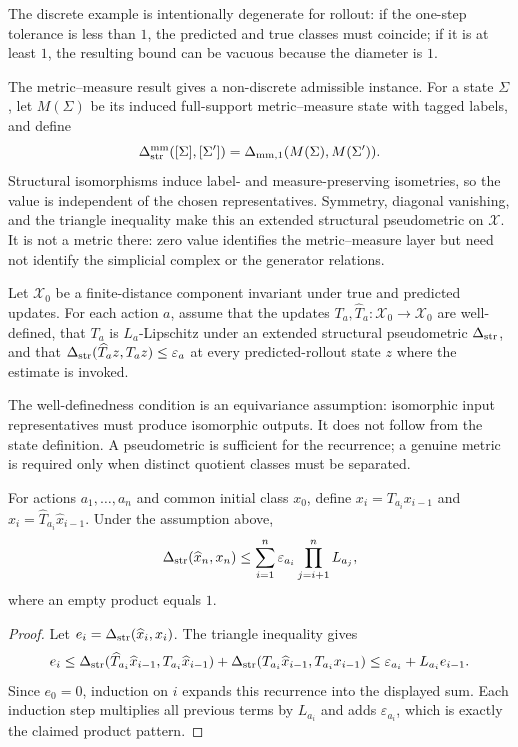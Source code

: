The discrete example is intentionally degenerate for rollout: if the one-step
tolerance is less than $1$, the predicted and true classes must coincide; if it
is at least $1$, the resulting bound can be vacuous because the diameter is
$1$.

The metric--measure result gives a non-discrete admissible instance. For a
state $\Sigma$, let $M(\Sigma)$ be its induced full-support metric--measure
state with tagged labels, and define
\[
 \Delta_{\mathrm{str}}^{\mathrm{mm}}([\Sigma],[\Sigma'])
 =\Delta_{\mathrm{mm},1}(M(\Sigma),M(\Sigma')).
\]
Structural isomorphisms induce label- and measure-preserving isometries, so the
value is independent of the chosen representatives. Symmetry, diagonal
vanishing, and the triangle inequality make this an extended structural
pseudometric on $\mathcal X$. It is not a metric there: zero value identifies
the metric--measure layer but need not identify the simplicial complex or the
generator relations.

\begin{assumption}
Let $\mathcal X_0$ be a finite-distance component invariant under true and
predicted updates. For each action $a$, assume that the updates
$T_a,\widehat T_a:\mathcal X_0\to\mathcal X_0$ are well-defined, that $T_a$ is
$L_a$-Lipschitz under an extended structural pseudometric $\Delta_{\mathrm{str}}$, and that
$\Delta_{\mathrm{str}}(\widehat T_a z,T_a z)\leq\varepsilon_a$ at every predicted-rollout
state $z$ where the estimate is invoked.
\end{assumption}

The well-definedness condition is an equivariance assumption: isomorphic input
representatives must produce isomorphic outputs. It does not follow from the
state definition. A pseudometric is sufficient for the recurrence; a genuine
metric is required only when distinct quotient classes must be separated.

\begin{theorem}
For actions $a_1,\ldots,a_n$ and common initial class $x_0$, define
$x_i=T_{a_i}x_{i-1}$ and $\widehat x_i=\widehat T_{a_i}\widehat x_{i-1}$. Under
the assumption above,
\[
\Delta_{\mathrm{str}}(\widehat x_n,x_n)\leq
\sum_{i=1}^n\varepsilon_{a_i}\prod_{j=i+1}^nL_{a_j},
\]
where an empty product equals $1$.
\end{theorem}

\begin{proof}
Let $e_i=\Delta_{\mathrm{str}}(\widehat x_i,x_i)$. The triangle inequality gives
\[
e_i\leq\Delta_{\mathrm{str}}(\widehat T_{a_i}\widehat x_{i-1},T_{a_i}\widehat x_{i-1})+
\Delta_{\mathrm{str}}(T_{a_i}\widehat x_{i-1},T_{a_i}x_{i-1})\leq\varepsilon_{a_i}+L_{a_i}e_{i-1}.
\]
Since $e_0=0$, induction on $i$ expands this recurrence into the displayed
sum. Each induction step multiplies all previous terms by $L_{a_i}$ and adds
$\varepsilon_{a_i}$, which is exactly the claimed product pattern.
\end{proof}

